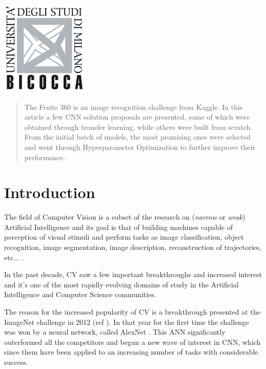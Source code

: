 \begin{titlepage}

\includegraphics{logo.png}\\[1cm] %
 

\vfill %

\end{titlepage}


\begin{abstract}
The Fruits 360 is an image recognition challenge from Kaggle. In this article a few CNN solution proposals are presented, some of which were obtained through transfer learning, while others were built from scratch. From the initial batch of models, the most promising ones were selected and went through Hyperparameter Optimization to further improve their performance.
\end{abstract}

\section{Introduction}
The field of Computer Vision is a subset of the research on (\textit{narrow} or \textit{weak}) Artificial Intelligence and its goal is that of building machines capable of perception of visual stimuli and perform tasks as image classification, object recognition, image segmentation, image description, reconstruction of trajectories, etc... .

In the past decade, CV saw a few important breakthroughs and increased interest and it's one of the most rapidly evolving domains of study in the Artificial Intelligence and Computer Science communities.

The reason for the increased popularity of CV is a breakthrough presented at the ImageNet challenge in 2012 (ref \cite{ImageNet2012}). In that year for the first time the challenge was won by a neural network, called AlexNet \cite{NIPS2012_4824}. This ANN significantly outerformed all the competitors and begun a new wave of interest in CNN, which since them have been applied to an increasing number of tasks with considerable success.

